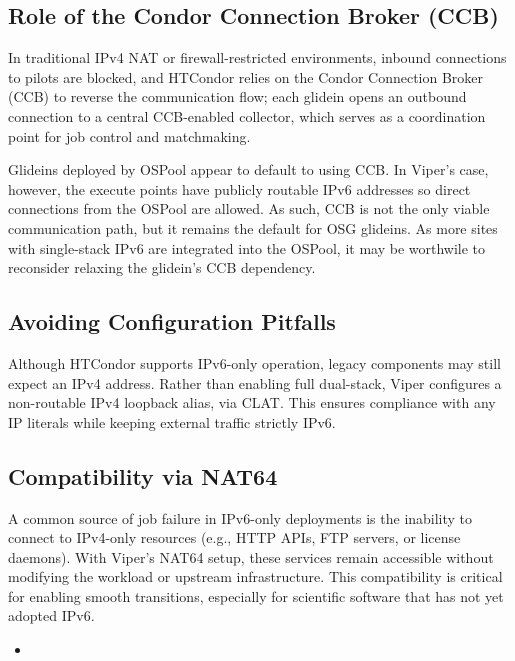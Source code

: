 \documentclass[11pt]{article}
\begin{document}
\subsection{Role of the Condor Connection Broker (CCB)}

In traditional IPv4 NAT or firewall-restricted environments, inbound connections to pilots are blocked, and HTCondor relies on the Condor Connection Broker (CCB) to reverse the communication flow; each glidein opens an outbound connection to a central CCB-enabled collector, which serves as a coordination point for job control and matchmaking.

Glideins deployed by OSPool appear to default to using CCB. In Viper’s case, however, the execute points have publicly routable IPv6 addresses so direct connections from the OSPool are allowed. As such, CCB is not the only viable communication path, but it remains the default for OSG glideins. As more sites with single-stack IPv6 are integrated into the OSPool, it may be worthwile to reconsider relaxing the glidein's CCB dependency.

\subsection{Avoiding Configuration Pitfalls}

Although HTCondor supports IPv6-only operation, legacy components may still expect an IPv4 address. Rather than enabling full dual-stack, Viper configures a non-routable IPv4 loopback alias, via CLAT. This ensures compliance with any IP literals while keeping external traffic strictly IPv6.


\subsection{Compatibility via NAT64}

A common source of job failure in IPv6-only deployments is the inability to connect to IPv4-only resources (e.g., HTTP APIs, FTP servers, or license daemons). With Viper’s NAT64 setup, these services remain accessible without modifying the workload or upstream infrastructure. This compatibility is critical for enabling smooth transitions, especially for scientific software that has not yet adopted IPv6.


\begin{itemize}
\item \color{red}{DISCUSS SITUATIONS THAT ARE PATHOLOGICAL OR PERNICIOUS}
\end{itemize}
\end{document}
